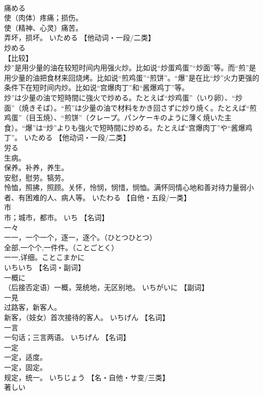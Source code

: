 \documentclass[8pt]{extreport}
\begin{document}
\begin{CJK}{UTF8}{min}
\\	痛める	
\\	使（肉体）疼痛；损伤。 
\\	使（精神、心灵）痛苦。 
\\	弄坏，损坏。	いためる		【他动词・一段/二类】
\\	炒める	
\\	【比较】 
\\	炒”是用少量的油在较短时间内用强火炒。比如说“炒蛋鸡蛋”“炒面”等。而“煎”是用少量的油把食材来回烧烤。比如说“煎鸡蛋”“煎饼”。“爆”是在比“炒”火力更强的条件下在短时间内炒。比如说“宫爆肉丁”和“酱爆鸡丁”等。 
\\	炒”は少量の油で短時間に強火で炒める。たとえば“炒鸡蛋”（いり卵）、“炒面”（焼きそば）。“煎”は少量の油で材料をかき回さずに炒り焼く。たとえば“煎鸡蛋”（目玉焼）、“煎饼”（クレープ。パンケーキのように薄く焼いた主食）。“爆”は“炒”よりも強火で短時間に炒める。たとえば“宫爆肉丁”や“酱爆鸡丁”。	いためる		【他动词・一段/二类】
\\	労る	
\\	生病。 
\\	保养。补养，养生。 
\\	安慰，慰劳。犒劳。 
\\	怜恤，照拂，照顾。关怀，怜悯，悯惜，悯恤。满怀同情心地和善对待力量弱小者、有困难的人、病人等。	いたわる		【自他・五段/一类】
\\	市	
\\	市；城市，都市。	いち		【名词】
\\	一々	
\\	一一，一个一个，逐一，逐个。（ひとつひとつ） 
\\	全部,一个个,一件件。（ことごとく） 
\\	一一,详细。ことこまかに
\\	いちいち		【名词・副词】
\\	一概に	
\\	（后接否定语）一概，笼统地，无区别地。	いちがいに		【副词】
\\	一見	
\\	过路客，新客人。 
\\	新客，（妓女）首次接待的客人。	いちげん		【名词】
\\	一言	
\\	一句话；三言两语。	いちげん		【名词】
\\	一定	
\\	一定，适度。 
\\	一定，固定。 
\\	规定，统一。	いちじょう		【名・自他・サ变/三类】
\\	著しい	

\end{CJK}
\end{document}
